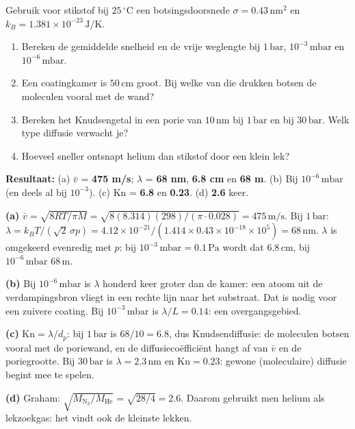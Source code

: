 \begin{oefening}
Gebruik voor stikstof bij \(25\,^\circ\mathrm{C}\) een botsingsdoorsnede \(\sigma = 0.43\,\mathrm{nm^2}\) en \(k_B = 1.381\times10^{-23}\,\mathrm{J/K}\).

\begin{enumerate}
\item[(a)]
  Bereken de gemiddelde snelheid en de vrije weglengte bij \(1\,\mathrm{bar}\), \(10^{-3}\,\mathrm{mbar}\) en \(10^{-6}\,\mathrm{mbar}\).
\item[(b)]
  Een coatingkamer is \(50\,\mathrm{cm}\) groot. Bij welke van die drukken botsen de moleculen vooral met de wand?
\item[(c)]
  Bereken het Knudsengetal in een porie van \(10\,\mathrm{nm}\) bij \(1\,\mathrm{bar}\) en bij \(30\,\mathrm{bar}\). Welk type diffusie verwacht je?
\item[(d)]
  Hoeveel sneller ontsnapt helium dan stikstof door een klein lek?
\end{enumerate}
\end{oefening}
\begin{oplossing}
\textbf{Resultaat:} (a) \(\bar v\) = \textbf{475 m/s}; \(\lambda\) = \textbf{68 nm}, \textbf{6.8 cm} en \textbf{68 m}. (b) Bij \(10^{-6}\,\mathrm{mbar}\) (en deels al bij \(10^{-3}\)). (c) \(\mathrm{Kn}\) = \textbf{6.8} en \textbf{0.23}. (d) \textbf{2.6} keer.

\textbf{(a)} \(\bar v = \sqrt{8RT/\pi M} = \sqrt{8(8.314)(298)/(\pi \cdot 0.028)} = 475\,\mathrm{m/s}\). Bij \(1\,\mathrm{bar}\): \(\lambda = k_BT/(\sqrt2\,\sigma p) = 4.12\times10^{-21}/(1.414 \times 0.43\times10^{-18} \times 10^5) = 68\,\mathrm{nm}\). \(\lambda\) is omgekeerd evenredig met \(p\): bij \(10^{-3}\,\mathrm{mbar} = 0.1\,\mathrm{Pa}\) wordt dat \(6.8\,\mathrm{cm}\), bij \(10^{-6}\,\mathrm{mbar}\) \(68\,\mathrm{m}\).

\textbf{(b)} Bij \(10^{-6}\,\mathrm{mbar}\) is \(\lambda\) honderd keer groter dan de kamer: een atoom uit de verdampingsbron vliegt in een rechte lijn naar het substraat. Dat is nodig voor een zuivere coating. Bij \(10^{-3}\,\mathrm{mbar}\) is \(\lambda/L = 0.14\): een overgangsgebied.

\textbf{(c)} \(\mathrm{Kn} = \lambda/d_p\): bij \(1\,\mathrm{bar}\) is \(68/10 = 6.8\), dus Knudsendiffusie: de moleculen botsen vooral met de poriewand, en de diffusieco\"effici\"ent hangt af van \(\bar v\) en de poriegrootte. Bij \(30\,\mathrm{bar}\) is \(\lambda = 2.3\,\mathrm{nm}\) en \(\mathrm{Kn} = 0.23\): gewone (moleculaire) diffusie begint mee te spelen.

\textbf{(d)} Graham: \(\sqrt{M_{\mathrm{N_2}}/M_\mathrm{He}} = \sqrt{28/4} = 2.6\). Daarom gebruikt men helium als lekzoekgas: het vindt ook de kleinste lekken.
\end{oplossing}

